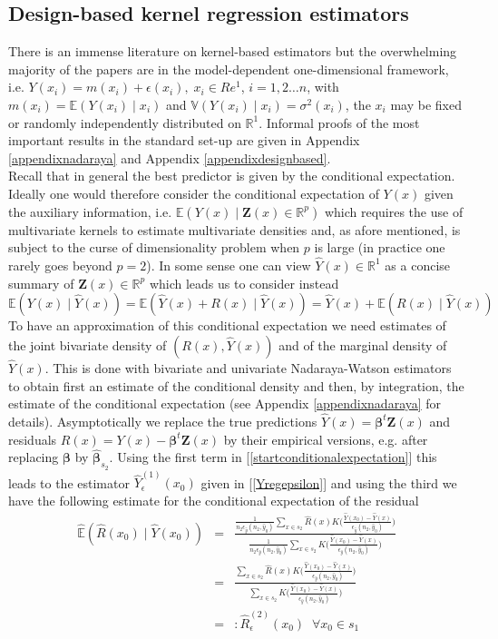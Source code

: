 \documentclass[a4paper,12pt,leqno, titlepage]{article}
\newcommand{\EX}{\mathbb{E}}
\newcommand{\VAR}{\mathbb{V}}
\newcommand{\R}{\mathbb{R}}
\begin{document}
\subsection{Design-based kernel regression estimators}\label{dbestimators}
There is an immense literature on kernel-based estimators but the overwhelming majority of the papers are in the model-dependent one-dimensional framework, i.e. $Y(x_i)=m(x_i)+\epsilon(x_i), \;x_i\in{Re^1}$, $i=1,2\ldots n$, with $m(x_i)=\EX(Y(x_i)\mid x_i)$ and $\VAR(Y(x_i)\mid x_i)=\sigma^2(x_i)$, the $x_i$ may be fixed or randomly independently distributed on $\R^1$. Informal proofs of the most important results in the standard set-up are given in Appendix \ref{appendixnadaraya} and Appendix \ref{appendixdesignbased}.\\
Recall that in general the best predictor is given by the conditional expectation. Ideally one would therefore consider the conditional expectation of $Y(x)$ given the auxiliary information, i.e. $\EX(Y(x)\mid\pmb{Z}(x)\in\R^p)$ which requires the use of multivariate kernels to estimate multivariate densities and, as afore mentioned, is subject to the curse of dimensionality problem when $p$ is large (in practice one rarely goes beyond $p=2$). In some sense one can view $\hat{Y}(x)\in\R^1$ as a concise summary of $\pmb{Z}(x)\in\R^p$ which leads us to consider instead
\begin{equation}\label{startconditionalexpectation}
 \EX(Y(x)\mid\hat{Y}(x))=\EX(\hat{Y}(x)+R(x)\mid\hat{Y}(x))= \hat{Y}(x)+\EX(R(x)\mid\hat{Y}(x))
 \end{equation}
 To have an approximation of this conditional expectation we need estimates of the joint bivariate density of $(R(x),\hat{Y}(x))$ and of the marginal density of $\hat{Y}(x)$. This is done with bivariate and univariate Nadaraya-Watson estimators to obtain first an estimate of the conditional density and then, by integration, the estimate of the conditional expectation (see Appendix \ref{appendixnadaraya} for details). Asymptotically we replace the true predictions $\hat{Y}(x)=\pmb{\beta}^t\pmb{Z}(x)$ and residuals $R(x)=Y(x)-\pmb{\beta}^t\pmb{Z}(x)$ by their empirical versions, e.g. after replacing $\pmb{\beta}$ by $\hat{\pmb{\beta}}_{s_2}$. Using the first term in [\ref{startconditionalexpectation}] this leads to the estimator $\hat{Y}^{(1)}_{\epsilon}(x_0)$  given in [\ref{Yregepsilon}] and using the third  we have the following estimate for the conditional expectation of the residual
 \begin{eqnarray}\label{conditionalmeanofresiduals2}
 \hat{\EX}(\hat{R}(x_0)\mid\hat{Y}(x_0))&=&\frac{\frac{1}{n_2\epsilon_{\hat{y}}(n_2,\hat{y}_0)}\sum_{x\in{s_2}}\hat{R}(x)
 K\big(\frac{\hat{Y}(x_0)-\hat{Y}(x)}{\epsilon_{\hat{y}}(n_2,\hat{y}_0)}\big)}{\frac{1}{n_2\epsilon_{\hat{y}}(n_2,\hat{y}_0)}\sum_{x\in{s_2}}
 K\big(\frac{\hat{Y}(x_0)-\hat{Y}(x)}{\epsilon_{\hat{y}}(n_2,\hat{y}_0)}\big)}\nonumber\\
 &=&\frac{\sum_{x\in{s_2}}\hat{R}(x)
 K\big(\frac{\hat{Y}(x_0)-\hat{Y}(x)}{\epsilon_{\hat{y}}(n_2,\hat{y}_0)}\big)}{\sum_{x\in{s_2}}
 K\big(\frac{\hat{Y}(x_0)-\hat{Y}(x)}{\epsilon_{\hat{y}}(n_2,\hat{y}_0)}\big)} \nonumber\\
 &=&:\hat{R}^{(2)}_{\epsilon}(x_0) \;\; \forall x_0\in{s_1}
 \end{eqnarray}
\end{document}
